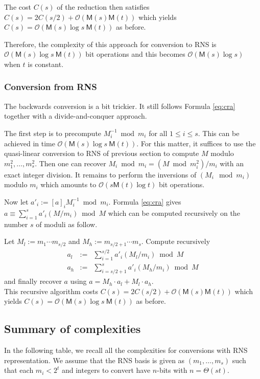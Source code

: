 \documentclass[acmtoms,acmnow]{acmtrans2m}
\def\M{\mathsf{M}} \def\I{\mathsf{I}} \def\R{\mathsf{R}} \def\Q{\mathbb{Q}}
\def\bigO{{\ensuremath{\mathcal{O}}}}
\newcommand{\assign}{:=}
\begin{document}
The cost $C(s)$ of the reduction then satisfies
$C(s) = 2 C(s/2) + \bigO(\M(s) \M(t))$ which yields
$C(s) = \bigO( \M(s) \log s~\M(t))$ as before.

Therefore, the complexity of this approach for conversion to RNS is $\bigO( \M(s) \log s~\M(t))$ bit operations and this becomes $\bigO( \M(s) \log s)$ when $t$ is constant.

\subsubsection{Conversion from RNS}

The backwards conversion is a bit trickier. It still follows Formula
\eqref{eq:cra} together with a divide-and-conquer approach.

The first step is to precompute $M_i^{-1} \bmod m_i$ for all
$1 \leqslant i \leqslant s$. This can be achieved in time $\bigO( \M(s) \log s~\M(t))$. For
this matter, it suffices to use the quasi-linear conversion to RNS of previous section to
compute $M$ modulo $m_1^2,\dots,m_s^2$. Then one can recover
$M_i \bmod m_i = \left(M \bmod m_i^2 \right)/m_i$ with an exact integer
division. It remains to perform the inversions of $(M_i \mod m_i)$ modulo $m_i$
which amounts to $\bigO(s \M(t)\log t)$ bit operations.

Now let $a'_i \assign [a]_iM_i^{-1} \bmod m_i$.  Formula
\eqref{eq:cra} gives $a \equiv \sum_{i=1}^s a'_i (M/m_i) \bmod M$ which can be
computed recursively on the number $s$ of moduli as follow.

Let $M_l \assign m_1 \cdots m_{s/2}$ and $M_h \assign m_{s/2+1} \cdots m_s$.
Compute recursively 
\begin{eqnarray*}
a_l & \assign & \sum_{i=1}^{s/2} a'_i (M_l/m_i) \bmod M\\
a_h & \assign & \sum_{i=s/2+1}^{s} a'_i (M_h/m_i) \bmod M
\end{eqnarray*}
and finally recover $a$ using $a = M_h \cdot a_l + M_l \cdot a_h$. \\
This recursive algorithm costs $C(s) = 2 C(s/2) + \bigO(\M(s) \M(t))$
which yields $C(s) = \bigO( \M(s) \log s~\M(t))$ as before.


\subsection{Summary of complexities}

In the following table, we recall all the complexities for conversions with RNS representation. We assume that the RNS basis is given as $(m_1,\dots,m_s)$ such that each $m_i<2^t$ and integers to
convert have $n$-bits with $n=\Theta(st)$.
\end{document}
